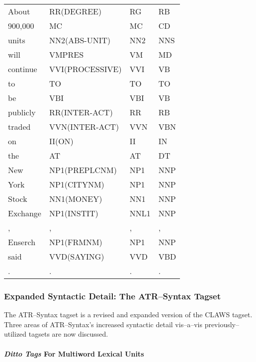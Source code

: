\begin{table}
\begin{center}
\begin{minipage}{0.53\textwidth}
\begin{tabular}{|l||l|l|l|}
   About	& RR(DEGREE)		& RG  &  RB \\
   900,000	& MC			& MC  &  CD \\
   units	& NN2(ABS-UNIT)		& NN2 &  NNS\\
   will	& VMPRES		& VM  &  MD \\
   continue & VVI(PROCESSIVE)	& VVI &  VB \\
   to	& TO			& TO  &  TO \\
   be	& VBI			& VBI &  VB \\
   publicly & RR(INTER-ACT)	& RR  &  RB \\
   traded	& VVN(INTER-ACT)	& VVN &  VBN\\
   on	& II(ON)		& II  &  IN \\
   the	& AT			& AT  &  DT \\
   New	& NP1(PREPLCNM)		& NP1 &  NNP\\
   York	& NP1(CITYNM)		& NP1 &  NNP\\
   Stock	& NN1(MONEY)		& NN1 &  NNP\\
   Exchange & NP1(INSTIT)		& NNL1&  NNP\\
   ,	& ,			& ,   &  ,  \\
   Enserch	& NP1(FRMNM)		& NP1 &  NNP\\
   said	& VVD(SAYING)		& VVD &  VBD\\
   .	& .			& .   &  .  \\ \hline
  \end{tabular}
 \renewcommand{\arraystretch}{}
 \end{minipage}
  \end{center}

\end{table}



\subsubsection{Expanded Syntactic Detail: The ATR--Syntax Tagset}

The ATR--Syntax tagset is a revised and expanded version of the CLAWS
tagset. Three areas of ATR--Syntax's increased syntactic detail
vis--a--vis previously--utilized tagsets are now discussed.

\paragraph{{\em\bf Ditto Tags} For Multiword Lexical Units}


